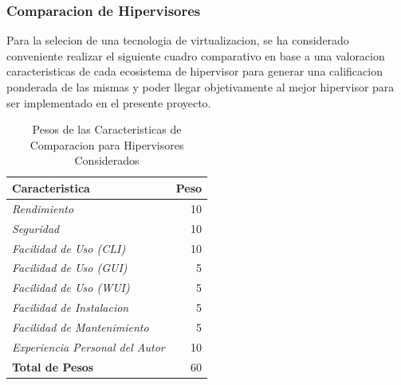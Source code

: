 \subsubsection{Comparacion de Hipervisores}
Para la selecion de una tecnologia de virtualizacion, se ha considerado conveniente realizar el siguiente cuadro comparativo en base a una valoracion caracteristicas de cada ecosistema de hipervisor para generar una calificacion ponderada de las mismas y poder llegar objetivamente al mejor hipervisor para ser implementado en el presente proyecto.

\begin{table}
	\centering
	\begin{tabular}{|l|r|}
    	\hline
		\textbf{Caracteristica} & \textbf{Peso} \\
        \hline
        \textit{Rendimiento} & 10 \\
        \textit{Seguridad} & 10 \\
        \textit{Facilidad de Uso (CLI)} & 10 \\
        \textit{Facilidad de Uso (GUI)} & 5 \\
        \textit{Facilidad de Uso (WUI)} & 5 \\
        \textit{Facilidad de Instalacion} & 5 \\
        \textit{Facilidad de Mantenimiento} & 5 \\
        \textit{Experiencia Personal del Autor} & 10 \\
        \hline
        \textbf{Total de Pesos} & 60 \\
        \hline
	\end{tabular}
    \caption{Pesos de las Caracteristicas de Comparacion para Hipervisores Considerados}
    \label{tab:hipervisor-compar-pesos}
\end{table}

